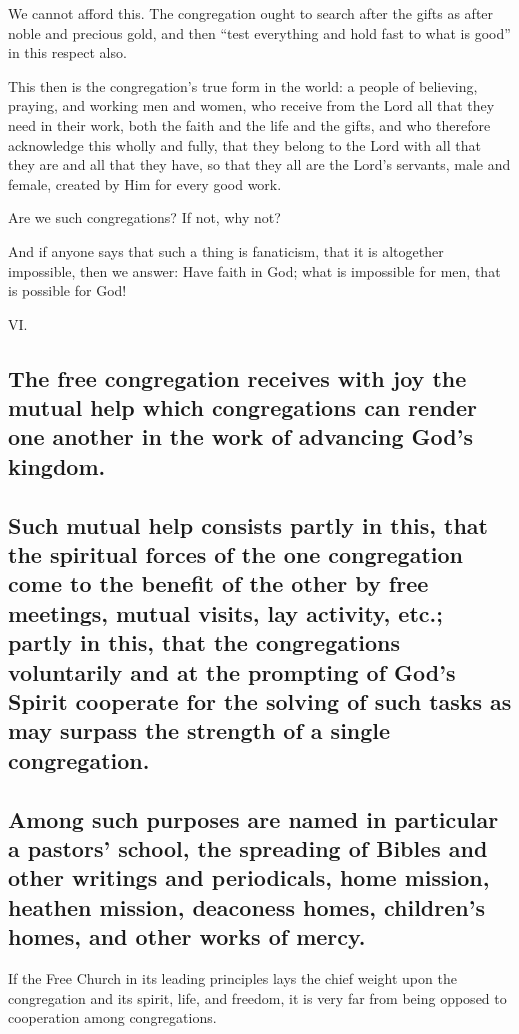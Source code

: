 We cannot afford this. The congregation ought to search after the gifts as after noble and precious gold, and then “test everything and hold fast to what is good” in this respect also.

This then is the congregation’s true form in the world: a people of believing, praying, and working men and women, who receive from the Lord all that they need in their work, both the faith and the life and the gifts, and who therefore acknowledge this wholly and fully, that they belong to the Lord with all that they are and all that they have, so that they all are the Lord’s servants, male and female, created by Him for every good work.

Are we such congregations? If not, why not?

And if anyone says that such a thing is fanaticism, that it is altogether impossible, then we answer: Have faith in God; what is impossible for men, that is possible for God!

VI.

\subsection{The free congregation receives with joy the mutual help which congregations can render one another in the work of advancing God’s kingdom.}

\subsection{Such mutual help consists partly in this, that the spiritual forces of the one congregation come to the benefit of the other by free meetings, mutual visits, lay activity, etc.; partly in this, that the congregations voluntarily and at the prompting of God’s Spirit cooperate for the solving of such tasks as may surpass the strength of a single congregation.}

\subsection{Among such purposes are named in particular a pastors’ school, the spreading of Bibles and other writings and periodicals, home mission, heathen mission, deaconess homes, children’s homes, and other works of mercy.}

If the Free Church in its leading principles lays the chief weight upon the congregation and its spirit, life, and freedom, it is very far from being opposed to cooperation among congregations.


